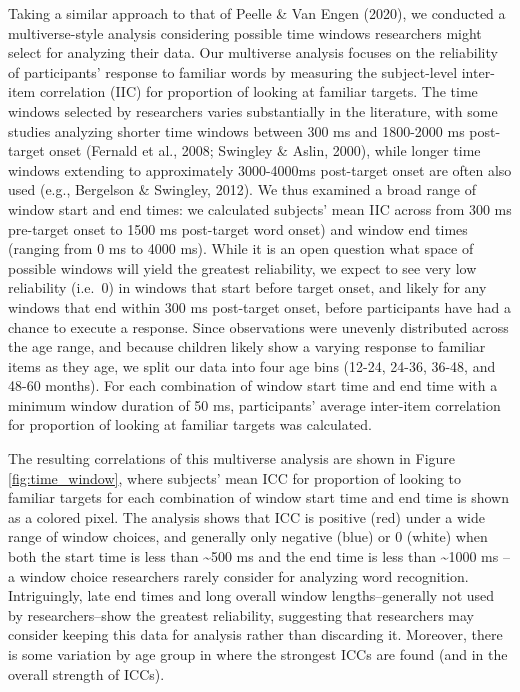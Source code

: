 \documentclass[10pt, letterpaper]{article}
\begin{document}
Taking a similar approach to that of Peelle \& Van Engen (2020), we
conducted a multiverse-style analysis considering possible time windows
researchers might select for analyzing their data. Our multiverse
analysis focuses on the reliability of participants' response to
familiar words by measuring the subject-level inter-item correlation
(IIC) for proportion of looking at familiar targets. The time windows
selected by researchers varies substantially in the literature, with
some studies analyzing shorter time windows between 300 ms and 1800-2000
ms post-target onset (Fernald et al., 2008; Swingley \& Aslin, 2000),
while longer time windows extending to approximately 3000-4000ms
post-target onset are often also used (e.g., Bergelson \& Swingley,
2012). We thus examined a broad range of window start and end times: we
calculated subjects' mean IIC across from 300 ms pre-target onset to
1500 ms post-target word onset) and window end times (ranging from 0 ms
to 4000 ms). While it is an open question what space of possible windows
will yield the greatest reliability, we expect to see very low
reliability (i.e.~0) in windows that start before target onset, and
likely for any windows that end within 300 ms post-target onset, before
participants have had a chance to execute a response. Since observations
were unevenly distributed across the age range, and because children
likely show a varying response to familiar items as they age, we split
our data into four age bins (12-24, 24-36, 36-48, and 48-60 months). For
each combination of window start time and end time with a minimum window
duration of 50 ms, participants' average inter-item correlation for
proportion of looking at familiar targets was calculated.

The resulting correlations of this multiverse analysis are shown in
Figure \ref{fig:time_window}, where subjects' mean ICC for proportion of
looking to familiar targets for each combination of window start time
and end time is shown as a colored pixel. The analysis shows that ICC is
positive (red) under a wide range of window choices, and generally only
negative (blue) or 0 (white) when both the start time is less than
\textasciitilde500 ms and the end time is less than \textasciitilde1000
ms -- a window choice researchers rarely consider for analyzing word
recognition. Intriguingly, late end times and long overall window
lengths--generally not used by researchers--show the greatest
reliability, suggesting that researchers may consider keeping this data
for analysis rather than discarding it. Moreover, there is some
variation by age group in where the strongest ICCs are found (and in the
overall strength of ICCs).
\end{document}
